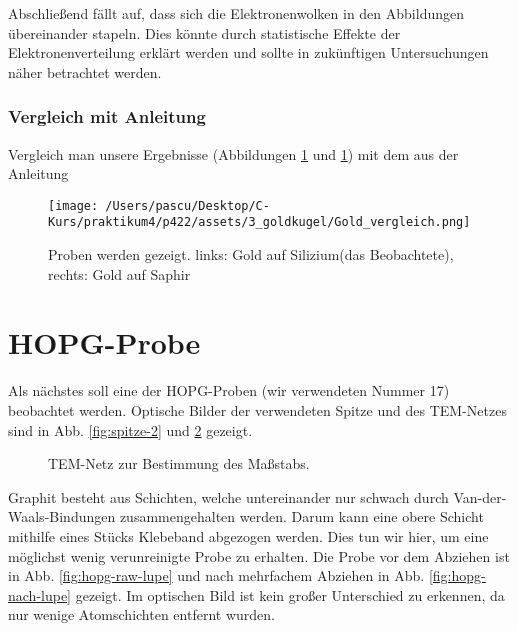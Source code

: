 \documentclass{article}
\begin{document}
Abschließend fällt auf, dass sich die Elektronenwolken in den Abbildungen übereinander stapeln. Dies könnte durch statistische Effekte der Elektronenverteilung erklärt werden und sollte in zukünftigen Untersuchungen näher betrachtet werden.

\subsubsection*{Vergleich mit Anleitung}

Vergleich man unsere Ergebnisse (Abbildungen \ref*{} und \ref*{}) mit dem aus der Anleitung \cite{Anleitung} 

\begin{figure}[h!]
    \centering
    \texttt{[image: /Users/pascu/Desktop/C-Kurs/praktikum4/p422/assets/3\_goldkugel/Gold\_vergleich.png]}
    \caption{Proben werden gezeigt. links: Gold auf Silizium(das Beobachtete), rechts: Gold auf Saphir}
    \label{fig:goldkugel_vergleich}
  \end{figure}


\newpage
\section{HOPG-Probe}
Als nächstes soll eine der HOPG-Proben (wir verwendeten Nummer 17) beobachtet werden. 
Optische Bilder der verwendeten Spitze und des TEM-Netzes sind in Abb. \ref{fig:spitze-2} und \ref{fig:gitter-hopg} gezeigt.
\begin{figure}[h]
    \centering
    \begin{minipage}{0.49\textwidth}
        \centering
        \caption{STM-Spitze, die zur Vermessung der HOPG-Probe verwendet wurde.
        Der Maßstab ergibt sich aus der Dicke des Drahts, welche \SI{0.3}{\mm} beträgt.
        Die Spitze wurde für diese Messung neu gerissen.}
        \label{fig:spitze-2}
    \end{minipage}
    \hfill
    \begin{minipage}{0.49\textwidth}
        \centering
        \caption{TEM-Netz zur Bestimmung des Maßstabs.}
        \label{fig:gitter-hopg}
    \end{minipage}
\end{figure}

Graphit besteht aus Schichten, welche untereinander nur schwach durch Van-der-Waals-Bindungen
zusammengehalten werden. Darum kann eine obere Schicht mithilfe eines Stücks Klebeband abgezogen werden.
Dies tun wir hier, um eine möglichst wenig verunreinigte Probe zu erhalten. Die Probe vor dem
Abziehen ist in Abb. \ref{fig:hopg-raw-lupe} und nach mehrfachem Abziehen in Abb. \ref{fig:hopg-nach-lupe}
gezeigt. Im optischen Bild ist kein großer Unterschied zu erkennen, da nur wenige Atomschichten entfernt wurden.
\end{document}

